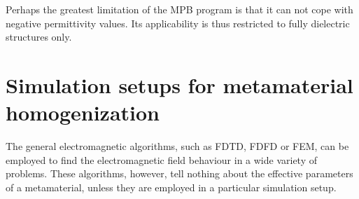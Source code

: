 Perhaps the greatest limitation of the MPB program is that it can not cope with negative permittivity values. Its applicability is thus restricted to fully dielectric structures only.	



\section{Simulation setups for metamaterial homogenization} 
The general electromagnetic algorithms,%
such as FDTD, FDFD or FEM, can be employed to find the electromagnetic field behaviour in a wide variety of problems. These algorithms, however, tell nothing about the effective parameters of a metamaterial, unless they are employed in a particular simulation setup. 

